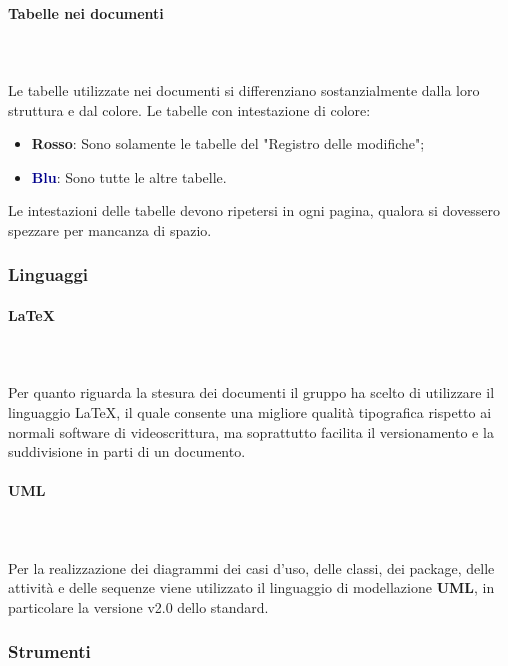 \paragraph{Tabelle nei documenti}\mbox{} \\ \\
Le tabelle utilizzate nei documenti si differenziano sostanzialmente dalla loro struttura e dal colore.
Le tabelle con intestazione di colore:
\begin{itemize}
    \item \textcolor{rossoep}{\textbf{Rosso}}: Sono solamente le tabelle del "Registro delle modifiche";
    \item \textcolor{darkblue}{\textbf{Blu}}: Sono tutte le altre tabelle.
\end{itemize}
Le intestazioni delle tabelle devono ripetersi in ogni pagina, qualora si dovessero spezzare per mancanza di spazio.

\subsubsection{Linguaggi}
\paragraph{\LaTeX}\mbox{} \\ \\
Per quanto riguarda la stesura dei documenti il gruppo ha scelto di utilizzare il linguaggio \LaTeX{}, il quale consente una migliore qualità tipografica rispetto ai normali software di videoscrittura, ma soprattutto facilita il versionamento e la suddivisione in parti di un documento.

\paragraph{UML}\mbox{}\\ \\
Per la realizzazione dei diagrammi dei casi d'uso, delle classi, dei package, delle attività e delle sequenze viene utilizzato il linguaggio di modellazione \textbf{UML}, in particolare la versione v2.0 dello standard.

\subsubsection{Strumenti}
